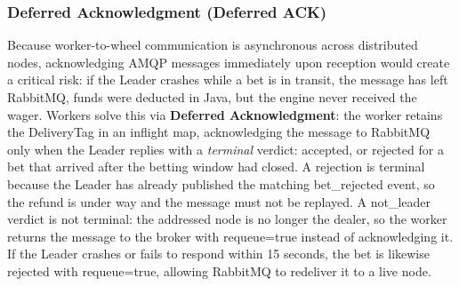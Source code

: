\documentclass[12pt,a4paper]{article}
\begin{document}
\subsubsection{Deferred Acknowledgment (Deferred ACK)}
Because worker-to-wheel communication is asynchronous across distributed nodes, acknowledging AMQP messages immediately upon reception would create a critical risk: if the Leader crashes while a bet is in transit, the message has left RabbitMQ, funds were deducted in Java, but the engine never received the wager. Workers solve this via \textbf{Deferred Acknowledgment}: the worker retains the DeliveryTag in an inflight map, acknowledging the message to RabbitMQ only when the Leader replies with a \textit{terminal} verdict: accepted, or rejected for a bet that arrived after the betting window had closed. A rejection is terminal because the Leader has already published the matching bet\_\allowbreak rejected event, so the refund is under way and the message must not be replayed. A not\_\allowbreak leader verdict is not terminal: the addressed node is no longer the dealer, so the worker returns the message to the broker with requeue=true instead of acknowledging it. If the Leader crashes or fails to respond within 15 seconds, the bet is likewise rejected with requeue=true, allowing RabbitMQ to redeliver it to a live node.
\end{document}
